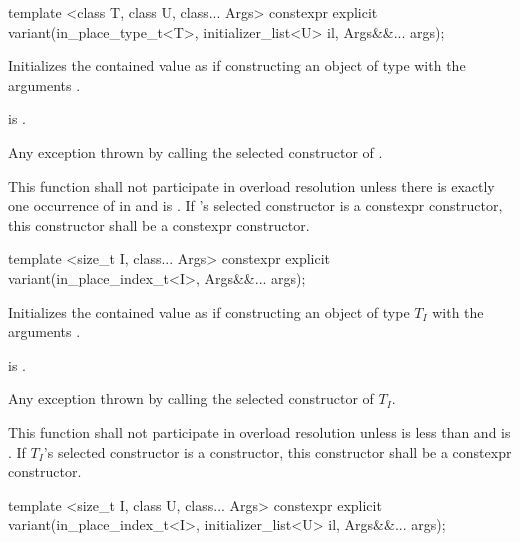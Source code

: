 %
\begin{itemdecl}
template <class T, class U, class... Args>
  constexpr explicit variant(in_place_type_t<T>, initializer_list<U> il, Args&&... args);
\end{itemdecl}

\begin{itemdescr}
\pnum
\effects
Initializes the contained value as if constructing an object of type 
with the arguments .

\pnum
\postconditions
{} is .

\pnum
\throws
Any exception thrown by calling the selected constructor of .

\pnum
\remarks
This function shall not participate in overload resolution unless there is
exactly one occurrence of  in  and
 is .
If 's selected constructor is a constexpr constructor, this
constructor shall be a constexpr constructor.
\end{itemdescr}

%
\begin{itemdecl}
template <size_t I, class... Args> constexpr explicit variant(in_place_index_t<I>, Args&&... args);
\end{itemdecl}

\begin{itemdescr}
\pnum
\effects
Initializes the contained value as if constructing an object of type $T_I$
with the arguments .

\pnum
\postconditions
{} is .

\pnum
\throws
Any exception thrown by calling the selected constructor of $T_I$.

\pnum
\remarks
This function shall not participate in overload resolution unless  is
less than  and  is .
If $T_I$'s selected constructor is a  constructor, this
constructor shall be a constexpr constructor.
\end{itemdescr}

%
\begin{itemdecl}
template <size_t I, class U, class... Args>
  constexpr explicit variant(in_place_index_t<I>, initializer_list<U> il, Args&&... args);
\end{itemdecl}


